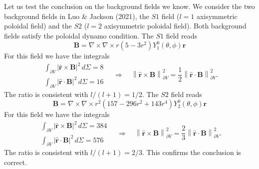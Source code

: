 \documentclass[a4paper, 11pt]{article}
\begin{document}
Let us test the conclusion on the background fields we know. We consider the two background fields in Luo \& Jackson (2021), the $S1$ field ($l=1$ axisymmetric poloidal field) and the $S2$ ($l=2$ axisymmetric poloidal field). Both background fields satisfy the poloidal dynamo condition. The $S1$ field reads
\[
    \mathbf{B} = \nabla\times \nabla\times r(5 - 3r^2) Y_1^0(\theta, \phi) \mathbf{r}
\]
For this field we have the integrals
\[
\begin{aligned}
    \int_{\partial V} |\hat{\mathbf{r}}\times \mathbf{B}|^2 \, d\Sigma = 8 \\ 
    \int_{\partial V} |\hat{\mathbf{r}}\cdot \mathbf{B}|^2 \, d\Sigma = 16
\end{aligned}\quad \Longrightarrow \quad
\left\|\hat{\mathbf{r}}\times \mathbf{B}\right\|^2_{\partial V} = \frac{1}{2} \left\|\hat{\mathbf{r}}\cdot \mathbf{B}\right\|^2_{\partial V}.
\]
The ratio is consistent with $l/(l+1) = 1/2$.
The $S2$ field reads
\[
    \mathbf{B} = \nabla\times \nabla\times r^2(157 - 296r^2 + 143r^4) Y_2^0(\theta, \phi) \mathbf{r}
\]
For this field we have the integrals
\[
\begin{aligned}
    \int_{\partial V} |\hat{\mathbf{r}}\times \mathbf{B}|^2 \, d\Sigma = 384 \\ 
    \int_{\partial V} |\hat{\mathbf{r}}\cdot \mathbf{B}|^2 \, d\Sigma = 576
\end{aligned}\quad \Longrightarrow \quad
\left\|\hat{\mathbf{r}}\times \mathbf{B}\right\|^2_{\partial V} = \frac{2}{3} \left\|\hat{\mathbf{r}}\cdot \mathbf{B}\right\|^2_{\partial V}.
\]
The ratio is consistent with $l/(l+1) = 2/3$. This confirms the conclusion is correct.
\end{document}
